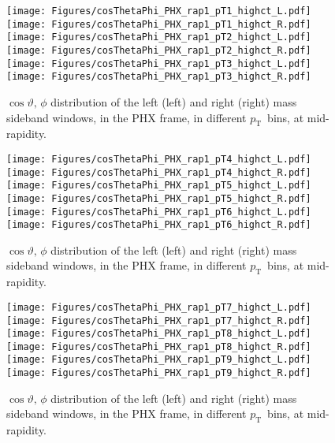 \documentclass[12pt]{article}
\newcommand{\pt}{$p_{\mathrm{T}}$}
\begin{document}

\begin{figure}[htbp]
\centering
\texttt{[image: Figures/cosThetaPhi\_PHX\_rap1\_pT1\_highct\_L.pdf]}
\texttt{[image: Figures/cosThetaPhi\_PHX\_rap1\_pT1\_highct\_R.pdf]}
\texttt{[image: Figures/cosThetaPhi\_PHX\_rap1\_pT2\_highct\_L.pdf]}
\texttt{[image: Figures/cosThetaPhi\_PHX\_rap1\_pT2\_highct\_R.pdf]}
\texttt{[image: Figures/cosThetaPhi\_PHX\_rap1\_pT3\_highct\_L.pdf]}
\texttt{[image: Figures/cosThetaPhi\_PHX\_rap1\_pT3\_highct\_R.pdf]}
\caption{$\cos\vartheta,\,\phi$ distribution of the left (left) and
  right (right) mass sideband windows, in the PHX frame, in different
  \pt\ bins, at mid-rapidity.}
\end{figure}
\clearpage

\begin{figure}[htbp]
\centering
\texttt{[image: Figures/cosThetaPhi\_PHX\_rap1\_pT4\_highct\_L.pdf]}
\texttt{[image: Figures/cosThetaPhi\_PHX\_rap1\_pT4\_highct\_R.pdf]}
\texttt{[image: Figures/cosThetaPhi\_PHX\_rap1\_pT5\_highct\_L.pdf]}
\texttt{[image: Figures/cosThetaPhi\_PHX\_rap1\_pT5\_highct\_R.pdf]}
\texttt{[image: Figures/cosThetaPhi\_PHX\_rap1\_pT6\_highct\_L.pdf]}
\texttt{[image: Figures/cosThetaPhi\_PHX\_rap1\_pT6\_highct\_R.pdf]}
\caption{$\cos\vartheta,\,\phi$ distribution of the left (left) and
  right (right) mass sideband windows, in the PHX frame, in different
  \pt\ bins, at mid-rapidity.} 
\end{figure}
\clearpage

\begin{figure}[htbp]
\centering
\texttt{[image: Figures/cosThetaPhi\_PHX\_rap1\_pT7\_highct\_L.pdf]}
\texttt{[image: Figures/cosThetaPhi\_PHX\_rap1\_pT7\_highct\_R.pdf]}
\texttt{[image: Figures/cosThetaPhi\_PHX\_rap1\_pT8\_highct\_L.pdf]}
\texttt{[image: Figures/cosThetaPhi\_PHX\_rap1\_pT8\_highct\_R.pdf]}
\texttt{[image: Figures/cosThetaPhi\_PHX\_rap1\_pT9\_highct\_L.pdf]}
\texttt{[image: Figures/cosThetaPhi\_PHX\_rap1\_pT9\_highct\_R.pdf]}
\caption{$\cos\vartheta,\,\phi$ distribution of the left (left) and
  right (right) mass sideband windows, in the PHX frame, in different
  \pt\ bins, at mid-rapidity.}
\end{figure}
\clearpage
\end{document}
